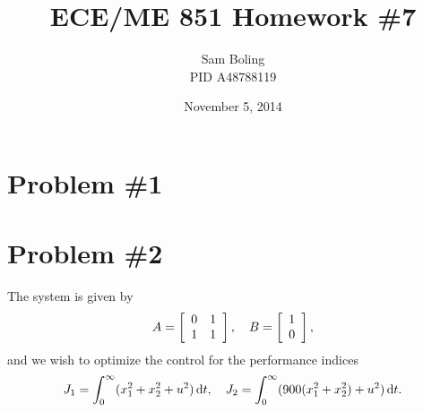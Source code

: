 \documentclass{article}
\title{ECE/ME 851 Homework \#7}
\date{November 5, 2014}
\author{Sam Boling \\ PID A48788119}
\begin{document}
\maketitle

\section*{Problem \#1}


\section*{Problem \#2}

The system is given by
$$
A =
\left[\begin{array}{c c}
  0 & 1 \\
  1 & 1
\end{array}\right], \quad
B =
\left[\begin{array}{c c}
  1 \\
  0
\end{array}\right],
$$
and we wish to optimize the control for the performance indices
$$
J_1 = \int_0^\infty (x_1^2 + x_2^2 + u^2) \dif t, \quad
J_2 = \int_0^\infty (900(x_1^2 + x_2^2) + u^2) \dif t.
$$
\end{document}
